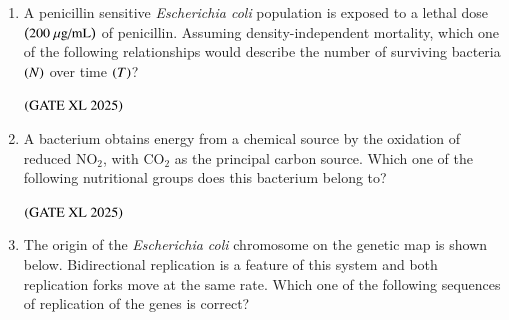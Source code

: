 \documentclass[journal]{IEEEtran}
\begin{document}
\begin{enumerate}
    \item A penicillin sensitive \textit{Escherichia coli} population is exposed to a lethal dose $\brak{200\ \mu\text{g/mL}}$ of penicillin. Assuming density-independent mortality, which one of the following relationships would describe the number of surviving bacteria $\left(N\right)$ over time $\left(T\right)$?

    \hfill $\left(\text{GATE XL 2025}\right)$
    \begin{enumerate}
    \end{enumerate}

    \item A bacterium obtains energy from a chemical source by the oxidation of reduced NO$_2$, with CO$_2$ as the principal carbon source. Which one of the following nutritional groups does this bacterium belong to?

    \hfill $\left(\text{GATE XL 2025}\right)$
    \begin{enumerate}
    \end{enumerate}

    \item The origin of the \textit{Escherichia coli} chromosome on the genetic map is shown below. Bidirectional replication is a feature of this system and both replication forks move at the same rate. Which one of the following sequences of replication of the genes is correct?


\end{enumerate}
\end{document}
